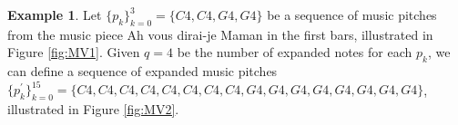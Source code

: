 \documentclass[11pt]{article}
\theoremstyle{definition}
\newtheorem{example}[theorem]{Example}
\begin{document}
\begin{example}
\label{ex: MV}
Let $ \{p_k\}_{k=0}^{3} = \{ C4, C4, G4, G4 \} $ be a sequence of music pitches from the music piece Ah vous dirai-je Maman in the first bars, illustrated in Figure \ref{fig:MV1}.
Given $q = 4$ be the number of expanded notes for each $p_k$, we can define a sequence of expanded music pitches $\{p^\prime_k\}_{k=0}^{15} = \{ C4, C4, C4, C4, C4, C4, C4, C4, G4, G4, G4, G4, G4, G4, G4, G4 \}$, illustrated in Figure \ref{fig:MV2}.

\end{example}
\end{document}
